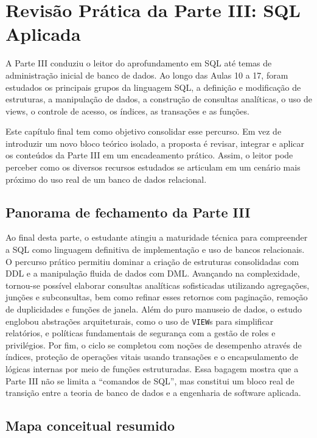 \chapter{Revisão Prática da Parte III: SQL Aplicada}
\label{cap:revisao_pratica_sql_aplicada}

A Parte III conduziu o leitor do aprofundamento em SQL até temas de administração inicial de banco de dados. Ao longo das Aulas 10 a 17, foram estudados os principais grupos da linguagem SQL, a definição e modificação de estruturas, a manipulação de dados, a construção de consultas analíticas, o uso de views, o controle de acesso, os índices, as transações e as funções.

Este capítulo final tem como objetivo consolidar esse percurso. Em vez de introduzir um novo bloco teórico isolado, a proposta é revisar, integrar e aplicar os conteúdos da Parte III em um encadeamento prático. Assim, o leitor pode perceber como os diversos recursos estudados se articulam em um cenário mais próximo do uso real de um banco de dados relacional.

\section{Panorama de fechamento da Parte III}

Ao final desta parte, o estudante atingiu a maturidade técnica para compreender a SQL como linguagem definitiva de implementação e uso de bancos relacionais. O percurso prático permitiu dominar a criação de estruturas consolidadas com DDL e a manipulação fluida de dados com DML. Avançando na complexidade, tornou-se possível elaborar consultas analíticas sofisticadas utilizando agregações, junções e subconsultas, bem como refinar esses retornos com paginação, remoção de duplicidades e funções de janela. Além do puro manuseio de dados, o estudo englobou abstrações arquiteturais, como o uso de \texttt{VIEW}s para simplificar relatórios, e políticas fundamentais de segurança com a gestão de roles e privilégios. Por fim, o ciclo se completou com noções de desempenho através de índices, proteção de operações vitais usando transações e o encapsulamento de lógicas internas por meio de funções estruturadas. Essa bagagem mostra que a Parte III não se limita a “comandos de SQL”, mas constitui um bloco real de transição entre a teoria de banco de dados e a engenharia de software aplicada.

\section{Mapa conceitual resumido}

